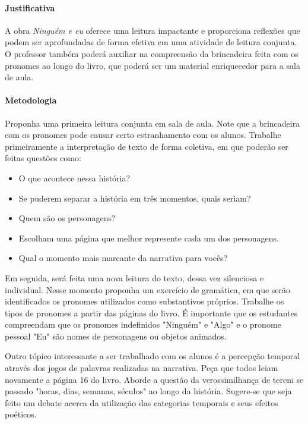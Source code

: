 \documentclass[11pt]{extarticle}
\begin{document}
\paragraph{Justificativa} A obra \textit{Ninguém e eu} oferece uma leitura impactante e proporciona reflexões que podem ser aprofundadas de forma efetiva em uma atividade de leitura conjunta. O professor também poderá auxiliar na compreensão da brincadeira feita com os pronomes ao longo do livro, que poderá ser um material enriquecedor para a sala de aula.

\paragraph{Metodologia} Proponha uma primeira leitura conjunta em sala de aula. Note que a brincadeira com os pronomes pode causar certo estranhamento com os alunos. Trabalhe primeiramente a interpretação de texto de forma coletiva, em que poderão ser feitas questões como:

\begin{itemize}

\item O que acontece nessa história? 

\item Se puderem separar a história em três momentos, quais seriam?

\item Quem são os personagens?

\item Escolham uma página que melhor represente cada um dos personagens.

\item Qual o momento mais marcante da narrativa para vocês?

\end{itemize}

Em seguida, será feita uma nova leitura do texto, dessa vez silenciosa e individual. Nesse momento proponha um exercício de gramática, em que serão identificados os pronomes utilizados como substantivos próprios. Trabalhe os tipos de pronomes a partir das páginas do livro. É importante que os estudantes compreendam que os pronomes indefinidos "Ninguém" e "Algo" e o pronome pessoal "Eu" são nomes de personagens ou objetos animados. 



Outro tópico interessante a ser trabalhado com os alunos é a percepção temporal através dos jogos de palavras realizadas na narrativa. Peça que todos leiam novamente a página 16 do livro. Aborde a questão da verossimilhança de terem se passado "horas, dias, semanas, séculos" ao longo da história. Sugere-se que seja feito um debate acerca da utilização das categorias temporais e seus efeitos poéticos.
\end{document}
